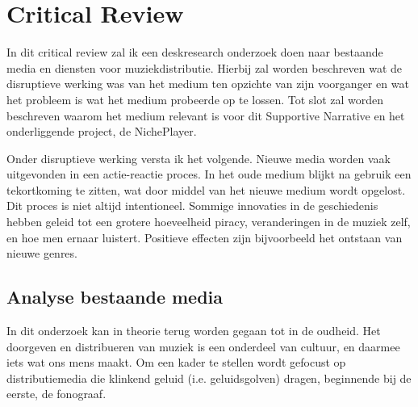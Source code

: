 \section{Critical Review}
\captionsetup[figure]{font=small,labelfont=bf}


In dit critical review zal ik een deskresearch onderzoek doen naar bestaande media en diensten voor muziekdistributie. Hierbij zal worden beschreven wat de disruptieve werking was van het medium ten opzichte van zijn voorganger en wat het probleem is wat het medium probeerde op te lossen. Tot slot zal worden beschreven waarom het medium relevant is voor dit Supportive Narrative en het onderliggende project, de NichePlayer.

Onder disruptieve werking versta ik het volgende. Nieuwe media worden vaak uitgevonden in een actie-reactie proces. In het oude medium blijkt na gebruik een tekortkoming te zitten, wat door middel van het nieuwe medium wordt opgelost. Dit proces is niet altijd intentioneel. Sommige innovaties in de geschiedenis hebben geleid tot een grotere hoeveelheid piracy, veranderingen in de muziek zelf, en hoe men ernaar luistert. Positieve effecten zijn bijvoorbeeld het ontstaan van nieuwe genres.


\subsection{Analyse bestaande media}
In dit onderzoek kan in theorie terug worden gegaan tot in de oudheid. Het doorgeven en distribueren van muziek is een onderdeel van cultuur, en daarmee iets wat ons mens maakt. Om een kader te stellen wordt gefocust op distributiemedia die klinkend geluid (i.e. geluidsgolven) dragen, beginnende bij de eerste, de fonograaf.

